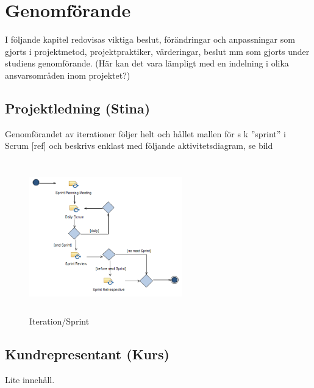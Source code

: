 
\section{Genomförande}
I följande kapitel redovisas viktiga beslut, förändringar och anpassningar som gjorts 
i projektmetod, projektpraktiker, värderingar, beslut mm som gjorts under studiens genomförande.
(Här kan det vara lämpligt med en indelning i olika ansvarsområden inom projektet?)

\subsection{Projektledning (Stina)}
Genomförandet av iterationer följer helt och hållet mallen för s k ”sprint” i Scrum [ref] 
och beskrivs enklast med följande aktivitetsdiagram, se  bild
\begin{figure}[htbp]
    \centerline{\includegraphics[max height=250px, max width=250px]{Z. images/sprint.png}}
    \caption{Iteration/Sprint}
    \label{fig}
\end{figure}

\subsection{Kundrepresentant (Kurs)}
Lite innehåll.

